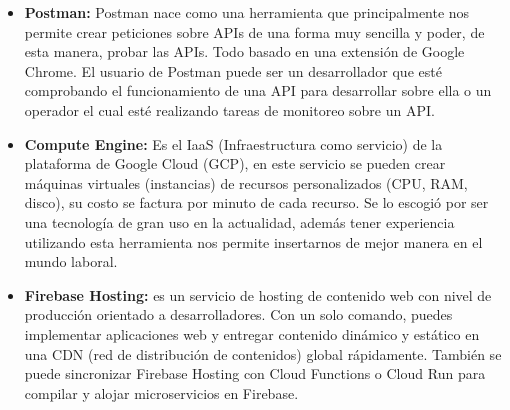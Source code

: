 \begin{itemize}
			\item \textbf{Postman:} Postman nace como una herramienta que principalmente nos permite crear peticiones sobre APIs de una forma muy sencilla y poder, de esta manera, probar las APIs. Todo basado en una extensión de Google Chrome. El usuario de Postman puede ser un desarrollador que esté comprobando el funcionamiento de una API para desarrollar sobre ella o un operador el cual esté realizando tareas de monitoreo sobre un API.
			
			\item  \textbf{Compute Engine:} Es el IaaS (Infraestructura como servicio) de la plataforma de Google Cloud (GCP), en este servicio se pueden crear máquinas virtuales (instancias) de recursos personalizados (CPU, RAM, disco), su costo se factura por minuto de cada recurso. Se lo escogió por ser una tecnología de gran uso en la actualidad, además tener experiencia utilizando esta herramienta nos permite insertarnos de mejor manera en el mundo laboral.
			\item \textbf{Firebase Hosting:} es un servicio de hosting de contenido web con nivel de producción orientado a desarrolladores. Con un solo comando, puedes implementar aplicaciones web y entregar contenido dinámico y estático en una CDN (red de distribución de contenidos) global rápidamente. También se puede sincronizar Firebase Hosting con Cloud Functions o Cloud Run para compilar y alojar microservicios en Firebase.
					
		\end{itemize}